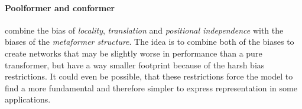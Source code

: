 \paragraph{Poolformer and conformer} \cite{metaformerPaper} combine the bias of \emph{locality}, \emph{translation} and \emph{positional independence} with the biases of the \emph{metaformer structure}.
The idea is to combine both of the biases to create networks that may be slightly worse in performance than a pure transformer, but have a way smaller footprint because of the harsh bias restrictions. 
It could even be possible, that these restrictions force the model to find a more fundamental and therefore simpler to express representation in some applications.

